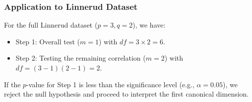 \subsubsection{Application to Linnerud Dataset }
For the full Linnerud dataset ($p=3, q=2$), we have:\begin{itemize}\item Step 1: Overall test ($m=1$) with $df = 3 \times 2 = 6$.\item Step 2: Testing the remaining correlation ($m=2$) with $df = (3-1)(2-1) = 2$.\end{itemize}If the $p$-value for Step 1 is less than the significance level (e.g., $\alpha = 0.05$), we reject the null hypothesis and proceed to interpret the first canonical dimension.